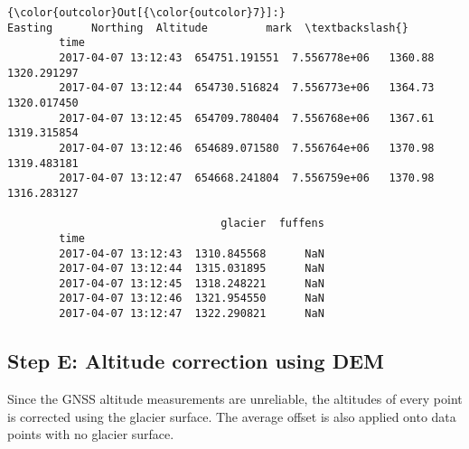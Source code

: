 \documentclass[11pt]{article}
\begin{document}
\begin{Verbatim}[commandchars=\\\{\}]
{\color{outcolor}Out[{\color{outcolor}7}]:}                            Easting      Northing  Altitude         mark  \textbackslash{}
        time                                                                      
        2017-04-07 13:12:43  654751.191551  7.556778e+06   1360.88  1320.291297   
        2017-04-07 13:12:44  654730.516824  7.556773e+06   1364.73  1320.017450   
        2017-04-07 13:12:45  654709.780404  7.556768e+06   1367.61  1319.315854   
        2017-04-07 13:12:46  654689.071580  7.556764e+06   1370.98  1319.483181   
        2017-04-07 13:12:47  654668.241804  7.556759e+06   1370.98  1316.283127   
        
                                 glacier  fuffens  
        time                                       
        2017-04-07 13:12:43  1310.845568      NaN  
        2017-04-07 13:12:44  1315.031895      NaN  
        2017-04-07 13:12:45  1318.248221      NaN  
        2017-04-07 13:12:46  1321.954550      NaN  
        2017-04-07 13:12:47  1322.290821      NaN  
\end{Verbatim}
            
    \subsection{Step E: Altitude correction using
DEM}\label{step-e-altitude-correction-using-dem}

Since the GNSS altitude measurements are unreliable, the altitudes of
every point is corrected using the glacier surface. The average offset
is also applied onto data points with no glacier surface.
\end{document}
